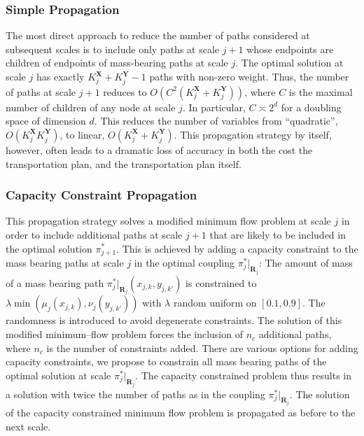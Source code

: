 \documentclass[twoside,11pt]{article}
\newcommand{\coupling}[0]{\pi}
\newcommand{\Xsp}{{\mathbf{X}}}
\newcommand{\Ysp}{{\mathbf{Y}}}
\begin{document}
\subsubsection{Simple Propagation}
\label{sec:simple}
The most direct approach to reduce the number of paths considered at subsequent
scales is to include only paths at scale $j+1$ whose endpoints are children of
endpoints of mass-bearing paths at scale $j$. The optimal solution at scale $j$
has exactly $K_j^{\Xsp} + K_j^{\Ysp} - 1$ paths with non-zero weight. Thus, the
number of paths at scale $j+1$ reduces to $O( C^2(K_{j}^{\Xsp} + K_j^{\Ysp}))$,
where $C$ is the maximal number of children of any node at scale $j$. In
particular, $C\asymp 2^{d}$ for a doubling space of dimension $d$. This reduces
the number of variables from ``quadratic'', $O(K_{j}^{\Xsp} K_j^{\Ysp} )$, to
linear,  $O(K_{j}^{\Xsp}+K_j^{\Ysp} )$.  This propagation strategy by itself,
however, often leads to a dramatic loss of accuracy in both the cost the
transportation plan, and the transportation plan itself.


\subsubsection{Capacity Constraint Propagation}
\label{sec:capacity}
This propagation strategy solves a modified minimum flow problem at scale $j$
in order to include additional paths at scale $j+1$ that are likely to be
included in the optimal solution $\coupling_{j+1}^*$. This is achieved by
adding a capacity constraint to the mass bearing paths at scale $j$ in the
optimal coupling  $ \coupling_j^* |_{\mathbf{R}_j}$: The amount of mass of a
mass bearing path $ \coupling_j^* |_{\mathbf{R}_j}( x_{j,k}, y_{j,k'} )$ is
constrained to $\lambda \min \left ( \mu_j(x_{j,k}), \nu_j(y_{j,k'})  \right)$
with $\lambda$ random uniform on $[0.1, 0.9]$. The randomness is introduced to
avoid degenerate constraints.  The solution of this modified minimum--flow
problem forces the inclusion of $n_c$ additional paths, where $n_c$ is the
number of constraints added. There are various options for adding capacity
constraints, we propose to constrain all mass bearing paths of the optimal
solution at scale $\coupling_j^*|_{\mathbf{R}_j}$. The capacity constrained
problem thus results in a solution with twice the number of paths as in the
coupling $\coupling_j^*|_{\mathbf{R}_j}$. The solution of the capacity
constrained minimum flow problem is propagated as before to the next scale.
\end{document}
